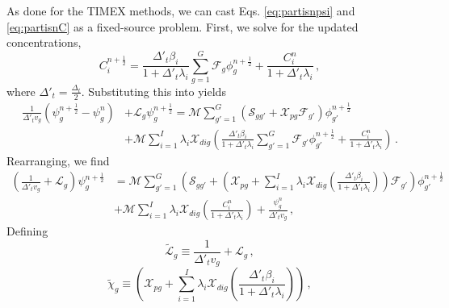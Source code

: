 As done for the TIMEX methods, we can cast Eqs. \ref{eq:partisnpsi}
and \ref{eq:partisnC} as a fixed-source problem.  First, we 
solve  for the updated concentrations,
\begin{equation}
   C_i^{n+\frac{1}{2}} = 
     \frac{ \Delta'_t \beta_i }{1+\Delta'_t \lambda_i} \sum_{g=1}^G \mathcal{F}_{g} \phi^{n+\frac{1}{2}}_{g} 
     + \frac{C_i^{n}}{1+\Delta'_t \lambda_i } \, ,
\end{equation}
where $\Delta'_t = \frac{\Delta_t}{2}$.
Substituting this into  yields
\begin{equation}
\begin{split}
  \frac{1}{\Delta'_t v_g} \left ( \psi^{n+\frac{1}{2}}_g - \psi^{n}_g \right )
     &+ \mathcal{L}_g\psi^{n+\frac{1}{2}}_g = 
       \mathcal{M} \sum_{g'=1}^G 
         \left (
           \mathcal{S}_{gg'} + 
           \mathcal{X}_{pg} \mathcal{F}_{g'} 
         \right )\phi^{n+\frac{1}{2}}_{g'} \\
    &+  \mathcal{M}\sum_{i=1}^{I} \lambda_i \mathcal{X}_{dig} 
     \left ( 
       \frac{ \Delta'_t \beta_i }{1+\Delta'_t \lambda_i} \sum_{g'=1}^G \mathcal{F}_{g'} \phi^{n+\frac{1}{2}}_{g'} 
       + \frac{C_i^{n}}{1+\Delta'_t \lambda_i } 
     \right ) \, .
\end{split}
\end{equation}
Rearranging, we find
\begin{equation}
\begin{split}
  \left ( \frac{1}{\Delta'_t v_g} + \mathcal{L}_g \right )\psi^{n+\frac{1}{2}}_g &= 
       \mathcal{M} \sum_{g'=1}^G 
         \left (
           \mathcal{S}_{gg'} + 
           \left( \mathcal{X}_{pg} +
                  \sum_{i=1}^{I} \lambda_i \mathcal{X}_{dig} \left ( \frac{ \Delta'_t \beta_i }{1+\Delta'_t \lambda_i} \right )
           \right ) \mathcal{F}_{g'} 
         \right )\phi^{n+\frac{1}{2}}_{g'} \\
   &+ \mathcal{M} \sum_{i=1}^{I} \lambda_i \mathcal{X}_{dig} 
      \left ( 
         \frac{C_i^{n}}{1+\Delta'_t \lambda_i } 
      \right ) + \frac{\psi^{n}_g}{\Delta'_t v_g} \, ,
\end{split}
\end{equation}
Defining
\begin{equation}
 \tilde{\mathcal{L}}_g \equiv \frac{1}{\Delta'_t v_g} + \mathcal{L}_g \, ,
\end{equation}
\begin{equation}
 \tilde{\chi}_g \equiv 
     \left( \mathcal{X}_{pg} +
        \sum_{i=1}^{I} \lambda_i \mathcal{X}_{dig} 
          \left ( \frac{ \Delta'_t \beta_i }{1+\Delta'_t \lambda_i} \right )
     \right )  \, ,
\end{equation}
